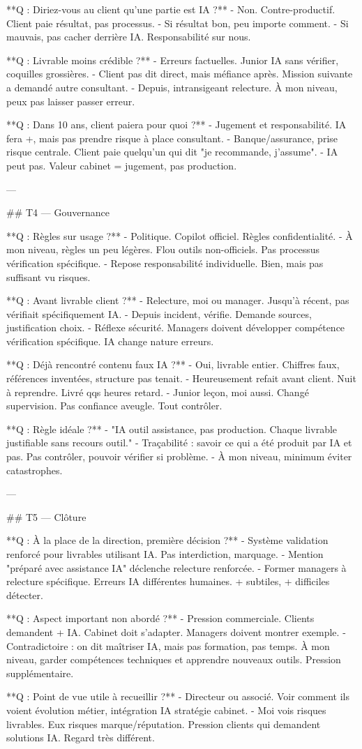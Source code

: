 **Q : Diriez-vous au client qu'une partie est IA ?**
- Non. Contre-productif. Client paie résultat, pas processus.
- Si résultat bon, peu importe comment.
- Si mauvais, pas cacher derrière IA. Responsabilité sur nous.

**Q : Livrable moins crédible ?**
- Erreurs factuelles. Junior IA sans vérifier, coquilles grossières.
- Client pas dit direct, mais méfiance après. Mission suivante a demandé autre consultant.
- Depuis, intransigeant relecture. À mon niveau, peux pas laisser passer erreur.

**Q : Dans 10 ans, client paiera pour quoi ?**
- Jugement et responsabilité. IA fera +, mais pas prendre risque à place consultant.
- Banque/assurance, prise risque centrale. Client paie quelqu'un qui dit "je recommande, j'assume".
- IA peut pas. Valeur cabinet = jugement, pas production.

---

## T4 — Gouvernance

**Q : Règles sur usage ?**
- Politique. Copilot officiel. Règles confidentialité.
- À mon niveau, règles un peu légères. Flou outils non-officiels. Pas processus vérification spécifique.
- Repose responsabilité individuelle. Bien, mais pas suffisant vu risques.

**Q : Avant livrable client ?**
- Relecture, moi ou manager. Jusqu'à récent, pas vérifiait spécifiquement IA.
- Depuis incident, vérifie. Demande sources, justification choix.
- Réflexe sécurité. Managers doivent développer compétence vérification spécifique. IA change nature erreurs.

**Q : Déjà rencontré contenu faux IA ?**
- Oui, livrable entier. Chiffres faux, références inventées, structure pas tenait.
- Heureusement refait avant client. Nuit à reprendre. Livré qqs heures retard.
- Junior leçon, moi aussi. Changé supervision. Pas confiance aveugle. Tout contrôler.

**Q : Règle idéale ?**
- "IA outil assistance, pas production. Chaque livrable justifiable sans recours outil."
- Traçabilité : savoir ce qui a été produit par IA et pas. Pas contrôler, pouvoir vérifier si problème.
- À mon niveau, minimum éviter catastrophes.

---

## T5 — Clôture

**Q : À la place de la direction, première décision ?**
- Système validation renforcé pour livrables utilisant IA. Pas interdiction, marquage.
- Mention "préparé avec assistance IA" déclenche relecture renforcée.
- Former managers à relecture spécifique. Erreurs IA différentes humaines. + subtiles, + difficiles détecter.

**Q : Aspect important non abordé ?**
- Pression commerciale. Clients demandent + IA. Cabinet doit s'adapter. Managers doivent montrer exemple.
- Contradictoire : on dit maîtriser IA, mais pas formation, pas temps. À mon niveau, garder compétences techniques et apprendre nouveaux outils. Pression supplémentaire.

**Q : Point de vue utile à recueillir ?**
- Directeur ou associé. Voir comment ils voient évolution métier, intégration IA stratégie cabinet.
- Moi vois risques livrables. Eux risques marque/réputation. Pression clients qui demandent solutions IA. Regard très différent.